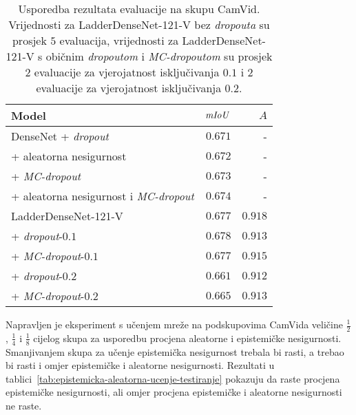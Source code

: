\documentclass[utf8, diplomski, lmodern]{fer}
\begin{document}
\begin{table}
	\centering\small
	\begin{tabular}{lrr}
		\toprule
		\bfseries Model & $\mathit{mIoU}$ & $A$ \\
		\midrule
		DenseNet + \textit{dropout} \citep{Kendall:2017:WUNBDLCV} & $0.671$ & - \\
		+ aleatorna nesigurnost & $0.672$ & - \\
		+ \textit{MC-dropout} & $0.673$ & -  \\
		+ aleatorna nesigurnost i \textit{MC-dropout} & $0.674$ & -\\
		\midrule
		LadderDenseNet-121-V & $0.677$ & $0.918$ \\
		+ \textit{dropout}-$0.1$ & $0.678$ & $0.913$ \\
		+ \textit{MC-dropout}-$0.1$ & $0.677$ & $0.915$ \\
		+ \textit{dropout}-$0.2$ & $0.661$ & $0.912$ \\
		+ \textit{MC-dropout}-$0.2$ & $0.665$ & $0.913$
		\\\bottomrule
	\end{tabular}
	\caption{Usporedba rezultata evaluacije na skupu CamVid. Vrijednosti za LadderDenseNet-121-V bez \textit{dropouta} su prosjek $5$ evaluacija, vrijednosti za LadderDenseNet-121-V s običnim \textit{dropoutom} i \textit{MC-dropoutom} su prosjek $2$ evaluacije za vjerojatnost isključivanja $0.1$ i $2$ evaluacije za vjerojatnost isključivanja $0.2$.}
	\label{tab:evaluacija-camvid}
\end{table}

Napravljen je eksperiment s učenjem mreže na podskupovima CamVida veličine $\frac{1}{2}$, $\frac{1}{4}$ i $\frac{1}{8}$ cijelog skupa za usporedbu procjena aleatorne i epistemičke nesigurnosti. Smanjivanjem skupa za učenje epistemička nesigurnost trebala bi rasti, a trebao bi rasti i omjer epistemičke i aleatorne nesigurnosti. Rezultati u tablici~\ref{tab:epistemicka-aleatorna-ucenje-testiranje} pokazuju da raste procjena epistemičke nesigurnosti, ali omjer procjena epistemičke i aleatorne nesigurnosti ne raste. 
\end{document}
